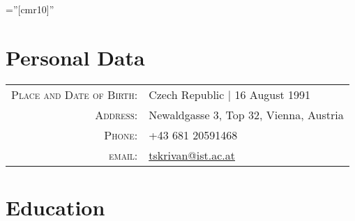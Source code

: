 \documentclass[a4paper,10pt]{article} %
\begin{document}


\pagestyle{empty} %

\font\fb=''[cmr10]'' %


\par{\bigskip\par} %

\section{Personal Data}

\begin{tabular}{rl}
  \textsc{Place and Date of Birth:} & Czech Republic  | 16 August 1991 \\
  \textsc{Address:} & Newaldgasse 3, Top 32, Vienna, Austria \\
  \textsc{Phone:} & +43 681 20591468\\
  \textsc{email:} & \href{mailto:tskrivan@ist.ac.at}{tskrivan@ist.ac.at}
\end{tabular}



\section{Education}
\end{document}
